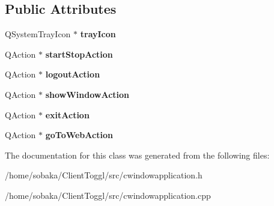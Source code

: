 \subsection*{Public Attributes}
\begin{DoxyCompactItemize}
\item 
\mbox{\label{classCWindowApplication_acc1bcd498a48a109bb3e75fc7757d476}} 
Q\+System\+Tray\+Icon $\ast$ {\bfseries tray\+Icon}
\item 
\mbox{\label{classCWindowApplication_a963f4894df394ea7b802d1ba1cd2e8a6}} 
Q\+Action $\ast$ {\bfseries start\+Stop\+Action}
\item 
\mbox{\label{classCWindowApplication_ae5071c43dd658445c6529365a8b78ea6}} 
Q\+Action $\ast$ {\bfseries logout\+Action}
\item 
\mbox{\label{classCWindowApplication_aec42380d2e85cdb4fbd5c9bdb3c920af}} 
Q\+Action $\ast$ {\bfseries show\+Window\+Action}
\item 
\mbox{\label{classCWindowApplication_a7cc264438b88eca7d7872887e8d79b62}} 
Q\+Action $\ast$ {\bfseries exit\+Action}
\item 
\mbox{\label{classCWindowApplication_a0a0e131c17d911f82a4b5b320495e800}} 
Q\+Action $\ast$ {\bfseries go\+To\+Web\+Action}
\end{DoxyCompactItemize}


The documentation for this class was generated from the following files\+:\begin{DoxyCompactItemize}
\item 
/home/sobaka/\+Client\+Toggl/src/cwindowapplication.\+h\item 
/home/sobaka/\+Client\+Toggl/src/cwindowapplication.\+cpp\end{DoxyCompactItemize}
